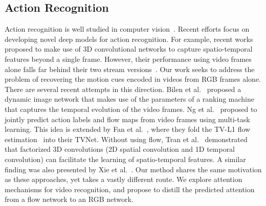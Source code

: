 \documentclass{bmvc2k}
\begin{document}
\subsection{Action Recognition} 
Action recognition is well studied in computer vision~\cite{poppe2010survey}. Recent efforts focus on developing novel deep models for action recognition. For example, recent works~\cite{tran2015learning,Hara_2018_CVPR,carreira2017quo} proposed to make use of 3D convolutional networks to capture spatio-temporal features beyond a single frame. However, their performance using video frames alone falls far behind their two stream versions~\cite{carreira2017quo}. Our work seeks to address the problem of recovering the motion cues encoded in videos from RGB frames alone. There are several recent attempts in this direction. Bilen et al.\ \cite{bilen2018action} proposed a dynamic image network that makes use of the parameters of a ranking machine that captures the temporal evolution of the video frames. Ng et al.\ \cite{ng2016actionflownet} proposed to jointly predict action labels and flow maps from video frames using multi-task learning. This idea is extended by Fan et al.\ \cite{fan2018end}, where they fold the TV-L1 flow estimation~\cite{perez2013tv} into their TVNet. Without using flow, Tran et al.\ \cite{Tran_2018_CVPR} demonstrated that factorized 3D convolutions (2D spatial convolution and 1D temporal convolution) can facilitate the learning of spatio-temporal features. A similar finding was also presented by Xie et al.\ \cite{Xie_2018_ECCV}. Our method shares the same motivation as these approaches, yet takes a vastly different route. We explore attention mechanisms for video recognition, and propose to distill the predicted attention from a flow network to an RGB network.
\end{document}
